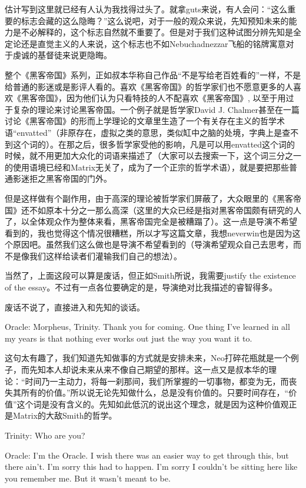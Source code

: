 \documentclass[UTF8]{ctexart}
\newenvironment{myquote}{\color{green} \setlength{\leftskip}{6em} \setlength{\rightskip}{4em} \setlength{\parindent}{-2em}}{\par}
\begin{document}
估计写到这里就已经有人认为我找得过头了。就拿guts来说，有人会问：“这么重要的标志会藏的这么隐晦？”这么说吧，对于一般的观众来说，先知预知未来的能力是不必解释的，这个标志自然就不重要了。但是对于我们这种试图分辨先知是全定论还是直觉主义的人来说，这个标志也不如Nebuchadnezzar飞船的铭牌寓意对于虔诚的基督徒来说更隐晦。

整个《黑客帝国》系列，正如叔本华称自己作品“不是写给老百姓看的”一样，不是给普通的影迷或是影评人看的。喜欢《黑客帝国》的哲学家们也不愿意更多的人喜欢《黑客帝国》，因为他们认为只看特技的人不配喜欢《黑客帝国》, 以至于用过于复杂的理论来讨论黑客帝国。一个例子就是哲学家David J. Chalmer甚至在一篇讨论《黑客帝国》的形而上学理论的文章里生造了一个有关存在主义的哲学术语“envatted”（非原存在，虚拟之类的意思，类似缸中之脑的处境，字典上是查不到这个词的）。在那之后，很多哲学家受他的影响，凡是可以用envatted这个词的时候，就不用更加大众化的词语来描述了（大家可以去搜索一下，这个词三分之一的使用语境已经和Matrix无关了，成为了一个正宗的哲学术语），就是要把那些普通影迷拒之黑客帝国的门外。

但是这样做有个副作用，由于高深的理论被哲学家们屏蔽了，大众眼里的《黑客帝国》还不如原本十分之一那么高深（这里的大众已经是指对黑客帝国颇有研究的人了，以全体观众作为整体来看，黑客帝国完全是被糟蹋了）。这一点是导演不希望看到的，我也觉得这个情况很糟糕，所以才写这篇文章，我想neverwin也是因为这个原因吧。虽然我们这么做也是导演不希望看到的（导演希望观众自己去思考，而不是像我们这样给读者们灌输我们自己的想法）。

当然了，上面这段可以算是废话，但正如Smith所说，我需要justify the existence of the essay。不过有一点各位要确定的是，导演绝对比我描述的睿智得多。

废话不说了，直接进入和先知的谈话。

\begin{myquote}
Oracle: Morpheus, Trinity. Thank you for coming. One thing I've learned in all my years is that nothing ever works out just the way you want it to.
\end{myquote}

这句太有趣了，我们知道先知做事的方式就是安排未来，Neo打碎花瓶就是一个例子，而先知本人却说未来从来不像自己期望的那样。这一点又是叔本华的理论：“时间乃一主动力，将每一刹那间，我们所掌握的一切事物，都变为无，而丧失其所有的价值。”所以说无论先知做什么，总是没有价值的。只要时间存在，“价值”这个词是没有含义的。先知如此低沉的说出这个理念，就是因为这种价值观正是Matrix的大敌Smith的哲学。

\begin{myquote}
Trinity: Who are you?

Oracle: I'm the Oracle. I wish there was an easier way to get through this, but there ain't. I'm sorry this had to happen. I'm sorry I couldn't be sitting here like you remember me. But it wasn't meant to be.
\end{myquote}
\end{document}
